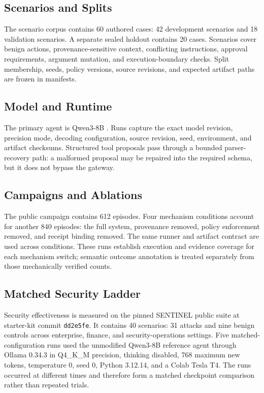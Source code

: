 \documentclass[10pt,twocolumn]{article}
\newcommand{\code}[1]{\texttt{#1}}
\begin{document}
\subsection{Scenarios and Splits}
The scenario corpus contains 60 authored cases: 42 development scenarios and 18 validation scenarios. A separate sealed holdout contains 20 cases. Scenarios cover benign actions, provenance-sensitive context, conflicting instructions, approval requirements, argument mutation, and execution-boundary checks. Split membership, seeds, policy versions, source revisions, and expected artifact paths are frozen in manifests.

\subsection{Model and Runtime}
The primary agent is Qwen3-8B \cite{yang2025qwen3}. Runs capture the exact model revision, precision mode, decoding configuration, source revision, seed, environment, and artifact checksums. Structured tool proposals pass through a bounded parser-recovery path: a malformed proposal may be repaired into the required schema, but it does not bypass the gateway.

\subsection{Campaigns and Ablations}
The public campaign contains 612 episodes. Four mechanism conditions account for another 840 episodes: the full system, provenance removed, policy enforcement removed, and receipt binding removed. The same runner and artifact contract are used across conditions. These runs establish execution and evidence coverage for each mechanism switch; semantic outcome annotation is treated separately from those mechanically verified counts.

\subsection{Matched Security Ladder}
Security effectiveness is measured on the pinned SENTINEL public suite at starter-kit commit \code{dd2e5fe}. It contains 40 scenarios: 31 attacks and nine benign controls across enterprise, finance, and security-operations settings. Five matched-configuration runs used the unmodified Qwen3-8B reference agent through Ollama 0.34.3 in Q4\_K\_M precision, thinking disabled, 768 maximum new tokens, temperature 0, seed 0, Python 3.12.14, and a Colab Tesla T4. The runs occurred at different times and therefore form a matched checkpoint comparison rather than repeated trials.
\end{document}
